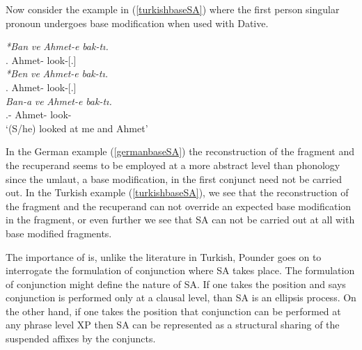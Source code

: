 Now consider the example in (\ref{turkishbaseSA}) where the first person singular pronoun undergoes base modification when used with Dative.

\begin{exe}
    \ex \label{turkishbaseSA}
    \begin{xlist}
        \ex
        \gll
        \textit{*Ban} \textit{ve} \textit{Ahmet-e} \textit{bak-tı.} \\ {\First}.{\Sg} {\And} Ahmet-{\Dat} look-{\Pst}[{\Third}.{\Sg}] \\
    
        \ex 
        \gll
        \textit{*Ben} \textit{ve} \textit{Ahmet-e} \textit{bak-tı.} \\ {\First}.{\Sg} {\And} Ahmet-{\Dat} look-{\Pst}[{\Third}.{\Sg}] \\
        
        \ex \gll 
        \textit{Ban-a} \textit{ve} \textit{Ahmet-e} \textit{bak-tı.} \\ {\First}.{\Sg}-{\Dat} {\And} Ahmet-{\Dat} look-{\Pst}\\
        \glt `(S/he) looked at me and Ahmet'
    \end{xlist}
\end{exe}

In the German example (\ref{germanbaseSA}) the reconstruction of the fragment and the recuperand seems to be employed at a more abstract level than phonology since the umlaut, a base modification, in the first conjunct need not be carried out. In the Turkish example (\ref{turkishbaseSA}), we see that the reconstruction of the fragment and the recuperand can not override an expected base modification in the fragment, or even further we see that SA can not be carried out at all with base modified fragments.

The importance of \cite{pounder2006broken} is, unlike the literature in Turkish, Pounder goes on to interrogate the formulation of conjunction where SA takes place. The formulation of conjunction might define the nature of SA. If one takes the position and says conjunction is performed only at a clausal level, than SA is an ellipsis process. On the other hand, if one takes the position that conjunction can be performed at any phrase level XP then SA can be represented as a structural sharing of the suspended affixes by the conjuncts.
































